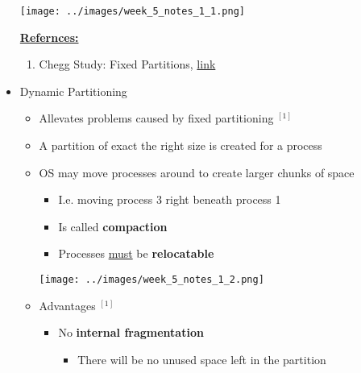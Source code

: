 \documentclass[12pt]{article}
\begin{document}
\begin{itemize}
    \begin{center}
    \texttt{[image: ../images/week\_5\_notes\_1\_1.png]}
    \end{center}

    \bigskip

    \underline{\textbf{Refernces:}}

    \bigskip

    \begin{enumerate}[1)]
        \item Chegg Study: Fixed Partitions, \href{https://www.chegg.com/homework-help/definitions/fixed-partitions-3}{link}
    \end{enumerate}
    \item Dynamic Partitioning
    \begin{itemize}
        \item Allevates problems caused by fixed partitioning $^{[1]}$
        \item A partition of exact the right size is created for a process
        \item OS may move processes around to create larger chunks of space
        \begin{itemize}
            \item I.e. moving process 3 right beneath process 1
            \item Is called \textbf{compaction}
            \item Processes \underline{must} be \textbf{relocatable}
        \end{itemize}

        \begin{center}
        \texttt{[image: ../images/week\_5\_notes\_1\_2.png]}
        \end{center}

        \item Advantages $^{[1]}$
        \begin{itemize}
            \item No \textbf{internal fragmentation}
            \begin{itemize}
                \item There will be no unused space left in the partition


\end{itemize}
\end{itemize}
\end{itemize}
\end{itemize}
\end{document}
